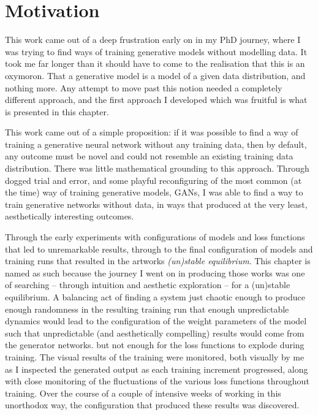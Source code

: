 \section{Motivation}

This work came out of a deep frustration early on in my PhD journey, where I was trying to find ways of training generative models without modelling data.
It took me far longer than it should have to come to the realisation that this is an oxymoron. 
That a generative model is a model of a given data distribution, and nothing more. 
Any attempt to move past this notion needed a completely different approach, and the first approach I developed which was fruitful is what is presented in this chapter. 

This work came out of a simple proposition: if it was possible to find a way of training a generative neural network without any training data, then by default, any outcome must be novel and could not resemble an existing training data distribution. 
There was little mathematical grounding to this approach. 
Through dogged trial and error, and some playful reconfiguring of the most common (at the time) way of training generative models, GANs, I was able to find a way to train generative networks without data, in ways that produced at the very least, aesthetically interesting outcomes. 

Through the early experiments with configurations of models and loss functions that led to unremarkable results, through to the final configuration of models and training runs that resulted in the artworks \textit{(un)stable equilibrium}.
This chapter is named as such because the journey I went on in producing those works was one of searching -- through intuition and aesthetic exploration -- for a (un)stable equilibrium. 
A balancing act of finding a system just chaotic enough to produce enough randomness in the resulting training run that enough unpredictable dynamics would lead to the configuration of the weight parameters of the model such that unpredictable (and aesthetically compelling) results would come from the generator networks. but not enough for the loss functions to explode during training. 
The visual results of the training were monitored, both visually by me as I inspected the generated output as each training increment progressed, along with close monitoring of the fluctuations of the various loss functions throughout training. 
Over the course of a couple of intensive weeks of working in this unorthodox way, the configuration that produced these results was discovered. 

